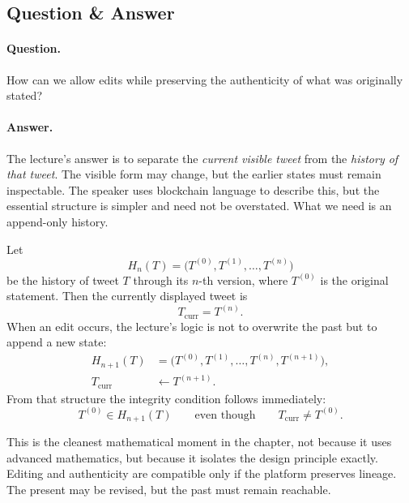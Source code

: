 \subsection{Question \& Answer}

\paragraph{Question.}
How can we allow edits while preserving the authenticity of what was originally stated?

\paragraph{Answer.}
The lecture's answer is to separate the \emph{current visible tweet} from the \emph{history of that tweet}. The visible form may change, but the earlier states must remain inspectable. The speaker uses blockchain language to describe this, but the essential structure is simpler and need not be overstated. What we need is an append-only history.

Let
\begin{equation}
H_n(T)=\bigl(T^{(0)},T^{(1)},\dots,T^{(n)}\bigr)
\end{equation}
be the history of tweet \(T\) through its \(n\)-th version, where \(T^{(0)}\) is the original statement. Then the currently displayed tweet is
\begin{equation}
T_{\mathrm{curr}} = T^{(n)}.
\end{equation}
When an edit occurs, the lecture's logic is not to overwrite the past but to append a new state:
\begin{align}
H_{n+1}(T) &= \bigl(T^{(0)},T^{(1)},\dots,T^{(n)},T^{(n+1)}\bigr), \\
T_{\mathrm{curr}} &\leftarrow T^{(n+1)}.
\end{align}
From that structure the integrity condition follows immediately:
\begin{equation}
T^{(0)} \in H_{n+1}(T)
\qquad
\text{even though}
\qquad
T_{\mathrm{curr}} \neq T^{(0)}.
\end{equation}

This is the cleanest mathematical moment in the chapter, not because it uses advanced mathematics, but because it isolates the design principle exactly. Editing and authenticity are compatible only if the platform preserves lineage. The present may be revised, but the past must remain reachable.

